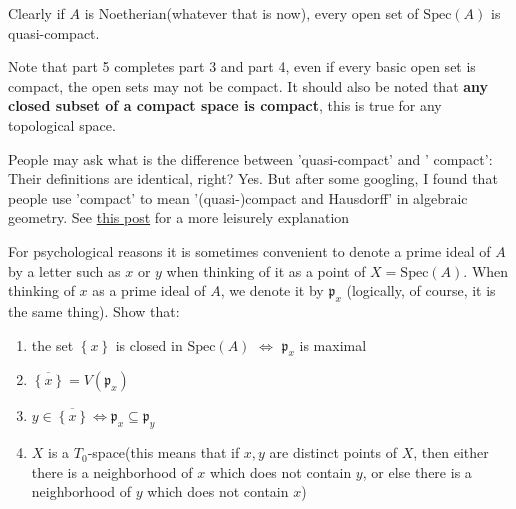 \documentclass{solution}
\begin{document}
{\color{red} Clearly if $A$ is Noetherian(whatever that is now), every open set of $\mathrm{Spec}(A)$ is quasi-compact.}

{\color{red} Note that part 5 completes part 3 and part 4, even if every basic open set is compact, the open sets may not be compact. It should also be noted that \textbf{any closed subset of a compact space is compact}, this is true for any topological space.}

{\color{red} People may ask what is the difference between 'quasi-compact' and '
compact': Their definitions are identical, right? Yes. But after some googling, I found that people use 'compact' to mean '(quasi-)compact and Hausdorff' in algebraic geometry. See \href{https://math.stackexchange.com/questions/57024/quasi-compact-and-compact-in-algebraic-geometry}{this post} for a more leisurely explanation}

\begin{problem}
    For psychological reasons it is sometimes convenient to denote a prime ideal of $A$ by a letter such as $x$ or $y$ when thinking of it as a point of $X = \mathrm{Spec}(A)$. When thinking of $x$ as a prime ideal of $A$, we denote it by $\mathfrak{p}_x$ (logically, of course, it is the same thing). Show that:
    \begin{enumerate}
        \item the set $\left\lbrace x \right\rbrace$ is closed in $\mathrm{Spec}(A)$ $\Leftrightarrow$ $\mathfrak{p}_x$ is maximal
        \item $\overline{\left\lbrace x \right\rbrace} = V(\mathfrak{p}_x)$
        \item $y \in \overline{\left\lbrace x \right\rbrace} \Leftrightarrow \mathfrak{p}_x \subseteq \mathfrak{p}_y$
        \item $X$ is a $T_0$-space(this means that if $x, y$ are distinct points of $X$, then either there is a neighborhood of $x$ which does not contain $y$, or else there is a neighborhood of $y$ which does not contain $x$)
    \end{enumerate}
\end{problem}
\end{document}
